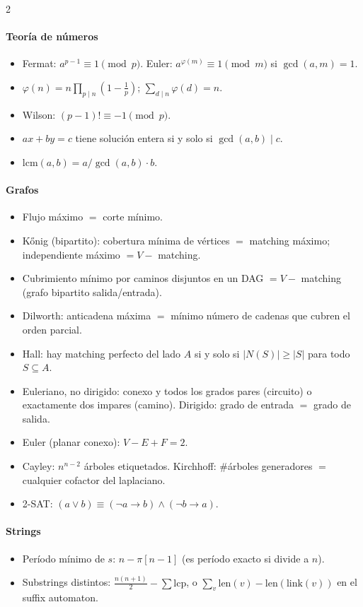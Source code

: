 \documentclass[8pt,a4paper,landscape]{extarticle}
\begin{document}
\begin{multicols*}{2}
\paragraph{Teor\'ia de n\'umeros}
\begin{itemize}
\item Fermat: $a^{p-1}\equiv 1 \pmod p$. Euler: $a^{\varphi(m)}\equiv 1
  \pmod m$ si $\gcd(a,m)=1$.
\item $\varphi(n) = n\prod_{p\mid n}(1-\frac1p)$;\;
  $\sum_{d\mid n}\varphi(d) = n$.
\item Wilson: $(p-1)! \equiv -1 \pmod p$.
\item $a x + b y = c$ tiene soluci\'on entera si y solo si
  $\gcd(a,b) \mid c$.
\item $\mathrm{lcm}(a,b) = a / \gcd(a,b) \cdot b$.
\end{itemize}

\paragraph{Grafos}
\begin{itemize}
\item Flujo m\'aximo $=$ corte m\'inimo.
\item K\H{o}nig (bipartito): cobertura m\'inima de v\'ertices $=$
  matching m\'aximo; independiente m\'aximo $= V -$ matching.
\item Cubrimiento m\'inimo por caminos disjuntos en un DAG
  $= V -$ matching (grafo bipartito salida/entrada).
\item Dilworth: anticadena m\'axima $=$ m\'inimo n\'umero de cadenas
  que cubren el orden parcial.
\item Hall: hay matching perfecto del lado $A$ si y solo si
  $|N(S)| \ge |S|$ para todo $S \subseteq A$.
\item Euleriano, no dirigido: conexo y todos los grados pares
  (circuito) o exactamente dos impares (camino). Dirigido: grado de
  entrada $=$ grado de salida.
\item Euler (planar conexo): $V - E + F = 2$.
\item Cayley: $n^{n-2}$ \'arboles etiquetados. Kirchhoff: \#\'arboles
  generadores $=$ cualquier cofactor del laplaciano.
\item 2-SAT: $(a \lor b) \equiv (\lnot a \to b) \land (\lnot b \to a)$.
\end{itemize}

\paragraph{Strings}
\begin{itemize}
\item Per\'iodo m\'inimo de $s$: $n - \pi[n-1]$ (es per\'iodo exacto
  si divide a $n$).
\item Substrings distintos: $\frac{n(n+1)}{2} - \sum \mathrm{lcp}$, o
  $\sum_v \mathrm{len}(v) - \mathrm{len}(\mathrm{link}(v))$ en el
  suffix automaton.
\end{itemize}


\end{multicols*}
\end{document}
